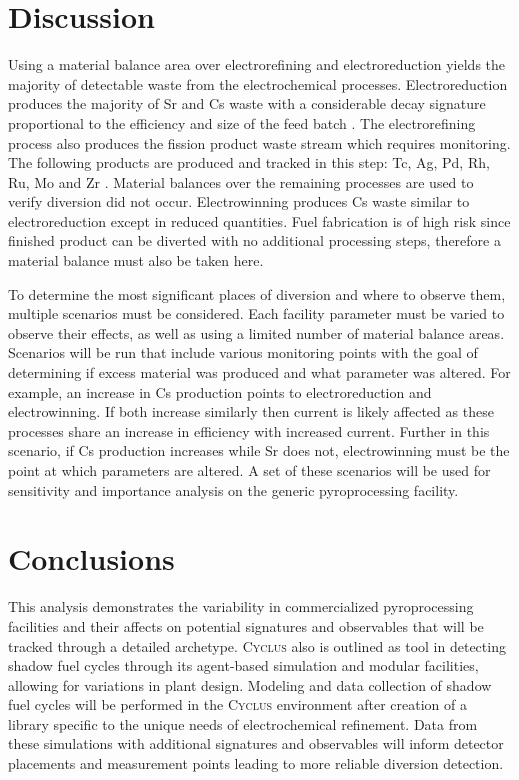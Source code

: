 \documentclass{anstrans}
\newcommand{\Cyclus}{\textsc{Cyclus}\xspace}%
\begin{document}
\section{Discussion}
Using a material balance area over electrorefining and electroreduction yields the majority of detectable waste from 
the electrochemical processes. Electroreduction produces the majority of Sr and Cs waste with a considerable decay 
signature proportional to the efficiency and size of the feed batch \cite{Borrelli_2017,flowsheet_1998}. The electrorefining 
process also produces the fission product waste stream which requires monitoring. The following products are produced 
and tracked in this step: Tc, Ag, Pd, Rh, Ru, Mo and Zr \cite{flowsheet_1998}. Material balances over the remaining 
processes are used to verify diversion did not occur. Electrowinning produces Cs waste similar to electroreduction 
except in reduced quantities. Fuel fabrication is of high risk since finished product can be diverted with no additional 
processing steps, therefore a material balance must also be taken here. 

To determine the most significant places of diversion and where to observe them, multiple scenarios must be considered. 
Each facility parameter must be varied to observe their effects, as well as using a limited number of material balance areas. 
Scenarios will be run that include various monitoring points with the goal of determining if excess material was produced 
and what parameter was altered. For example, an increase in Cs production points to electroreduction and electrowinning. 
If both increase similarly then current is likely affected as these processes share an increase in efficiency with increased 
current. Further in this scenario, if Cs production increases while Sr does not, electrowinning must be the point at which 
parameters are altered. A set of these scenarios will be used for sensitivity and importance analysis on the generic 
pyroprocessing facility.

\section{Conclusions}
This analysis demonstrates the variability in commercialized pyroprocessing facilities and their affects on potential 
signatures and observables that will be tracked through a detailed archetype. \Cyclus also is outlined as tool in 
detecting shadow fuel cycles through its agent-based simulation and modular facilities, allowing for variations in 
plant design. Modeling and data collection of shadow fuel cycles will be performed in the \Cyclus environment after 
creation of a library specific to the unique needs of electrochemical refinement. Data from these simulations with 
additional signatures and observables will inform detector placements and measurement points leading to more 
reliable diversion detection.
\end{document}
